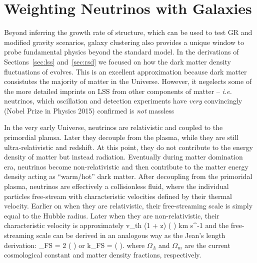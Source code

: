 \section{Weighting Neutrinos with Galaxies} \label{sec:mneut}
Beyond inferring the growth rate of structure, which 
can be used to test GR and modified gravity scenarios, galaxy clustering
also provides a unique window to probe fundamental physics beyond the 
standard model. 
In the derivations of Sections~\ref{sec:lss} and~\ref{sec:rsd} we focused 
on how the dark matter density fluctuations of evolves. This is an excellent
approximation because dark matter consistutes the majority of matter in the 
Universe. However, it negelects some of the more detailed imprints on 
LSS from other components of matter -- \emph{i.e.} neutrinos, which  
oscillation and detection experiments have \emph{very} convincingly 
(Nobel Prize in Physics 2015) confirmed is {\em not} massless~\citep[][]{Lesgourgues:2012aa}

In the very early Universe, neutrinos are relativistic and coupled to the 
primordial plamsa. Later they decouple from the plasma, while they are still 
ultra-relativistic and redshift. At this point, they do not 
contribute to the energy density of matter but instead radiation. Eventually during 
matter domination era, neutrinos become non-relativistic and then contribute 
to the matter energy density acting as ``warm/hot'' dark matter.
After decoupling from the primoridal plasma, neutrinos are effectively a
collisionless fluid, where the individual particles free-stream with 
characteristic velocities defined by their thermal velocity. Earlier on 
when they are relativistic, their free-streaming scale is simply 
equal to the Hubble radius. Later when they are non-relativistic, 
their characteristic velocity is approximately  
\beq
v_{\rm th}  (1 + z) \left( \right) \; \; {\rm km \; s^{-1}}
\eeq
and the free-streaming scale can be derived in an analogous way as the 
Jean's length derivation: 
\beq
\lambda_{\rm FS} = 2 \pi {} \left(  \right)
\eeq
or 
\beq \label{eq:kfs}
k_{\rm FS} =    \left( \right).
\eeq
where $\Omega_\Lambda$ and $\Omega_m$ are the current cosmological constant and matter 
density fractions, respectively.

